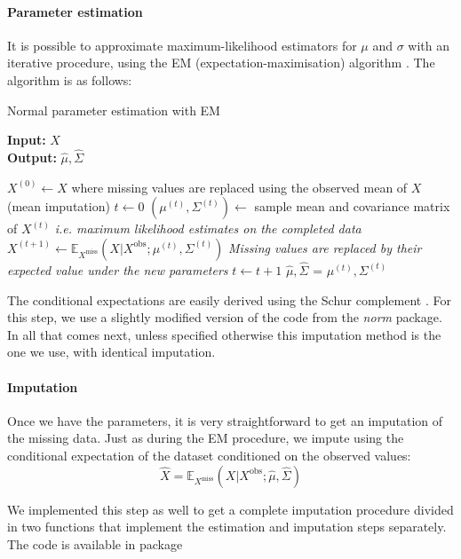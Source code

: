 \paragraph{Parameter estimation}
It is possible to approximate maximum-likelihood estimators for $\mu$ and $\sigma$ with an iterative procedure, using the EM (expectation-maximisation) algorithm \cite{EM} \cite{em_normal_fit}. The algorithm is as follows:
\begin{algorithm}[H]
	\caption{Normal parameter estimation with EM}
	\hspace*{\algorithmicindent} \textbf{Input:} $X$  \\
 	\hspace*{\algorithmicindent} \textbf{Output:} $\hat{\mu}, \hat{\Sigma}$
	\begin{algorithmic}[1]
		\State $X^{(0)} \leftarrow X$ where missing values are replaced using the observed mean of $X$ (mean imputation)
		\State $t \leftarrow 0$
			\State $(\mu^{(t)}, \Sigma^{(t)}) \leftarrow$  sample mean and covariance matrix of $X^{(t)}$ \Comment \emph{i.e. maximum likelihood estimates on the completed data}
			\State $X^{(t+1)} \leftarrow  \mathbb{E}_{X^{\text{miss}}}(X \vert X^{\text{obs}} ; \mu^{(t)}, \Sigma^{(t)})$ \Comment \emph{Missing values are replaced by their expected value under the new parameters}
			\State $t \leftarrow t+1$
		\EndWhile
		\State $\hat{\mu}, \hat{\Sigma}$ = $\mu^{(t)}, \Sigma^{(t)}$
	\end{algorithmic}
\end{algorithm}

The conditional expectations are easily derived using the Schur complement \cite{norm_schur}. For this step, we use a slightly modified version of the code from the \emph{norm} package. In all that comes next, unless specified otherwise this imputation method is the one we use, with identical imputation.

\paragraph{Imputation}
Once we have the parameters, it is very straightforward to get an imputation of the missing data. Just as during the EM procedure, we impute using the conditional expectation of the dataset conditioned on the observed values: 
$$\hat{X} = \mathbb{E}_{X^{\text{miss}}}(X \vert X^{\text{obs}} ; \hat{\mu}, \hat{\Sigma})$$

We implemented this step as well to get a complete imputation procedure divided in two functions that implement the estimation and imputation steps separately. The code is available in package 

